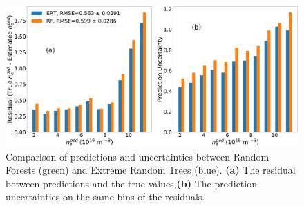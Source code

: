 \documentclass[a4paper, twoside, final, 12pt]{article}
\begin{document}
{\begin{figure}[h!]
	\centering
	\includegraphics[scale=0.2]{./src/Tree_Comp}
			\caption{Comparison of predictions and uncertainties between Random Forests (green) and Extreme Random Trees (blue). \textbf{(a)} The residual between predictions and the true values,\textbf{(b)} The prediction uncertainties on the same bins of the residuals. }
	\label{fig:RF_Preds}
\end{figure}

}
\end{document}
